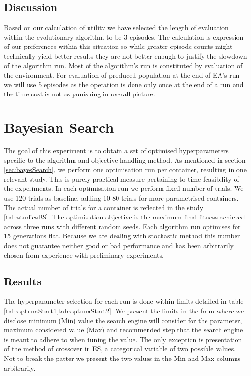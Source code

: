 \subsection{Discussion}
 Based on our calculation of utility we have selected the length of evaluation within the evolutionary algorithm  to be 3 episodes. The calculation is expression of our preferences within this situation so while greater episode counts might technically yield better results they are not better enough to justify the slowdown of the algorithm run. Most of the algorithm's run is constituted by evaluation of the environment.  For evaluation of produced population at the end of EA's run we will use 5 episodes as the operation is done only once at the end of a run and the time cost is not as punishing in overall picture. 
\section{Bayesian Search}
\label{sec:bayesianSearchExec}
The goal of this experiment is to obtain a set of optimised hyperparameters specific to the algorithm and objective handling method. 
As mentioned in section \ref{sec:bayesSearch}, we perform one optimisation run per container, resulting in one relevant study. This is purely practical measure pertaining to time feasibility of the experiments. In each optimisation run we perform fixed number of trials. We use 120 trials as baseline, adding 10-80 trials for more parametrised containers. The actual number of trials for a container is reflected in the study \cref{tab:studiesBS}. 
The optimisation objective is the maximum final fitness achieved across three runs with different random seeds. Each algorithm run optimises for 15 generations flat.   
Because we are dealing with stochastic method this number does not guarantee neither good or bad performance and has been arbitrarily chosen from experience with preliminary experiments.
\subsection{Results}
The hyperparameter selection for each run is done within limits detailed in table \cref{tab:optunaStart1,tab:optunaStart2}. We present the limits in the form where we disclose minimum (Min) value the search engine will consider for the parameter, maximum considered value (Max) and recommended step that the search engine is meant to adhere to when tuning the value. The only exception is presentation of the method of crossover in ES, a categorical variable of two possible values. Not to break the patter we present the two values in the Min and Max columns arbitrarily. 

